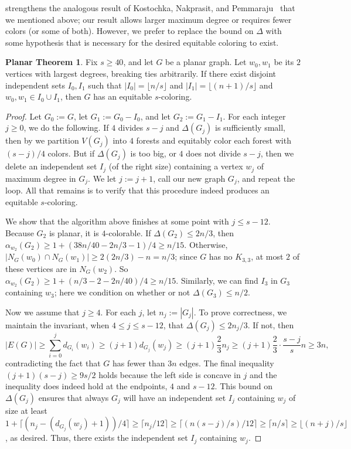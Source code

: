 \documentclass[11pt]{article}
\theoremstyle{definition}
\newtheorem*{planarthm}{Planar Theorem}
\newcommand\floor[1]{\lfloor#1\rfloor}
\newcommand\ceil[1]{\lceil#1\rceil}
\renewcommand\ge\geqslant
\renewcommand\le\leqslant
\begin{document}
 strengthens the analogous result of Kostochka, Nakprasit, and Pemmaraju~\cite{KNP} that we mentioned above; our result 
allows larger maximum degree or requires fewer colors (or some of both).  
However, we prefer to replace the bound on $\Delta$ with some hypothesis that is necessary for the desired equitable coloring to exist.  
\begin{planarthm}
	Fix $s\ge 40$, and let $G$ be a planar graph.  Let $w_0,w_1$ be its $2$ vertices with largest degrees, breaking ties arbitrarily.
	If there exist disjoint independent sets $I_0, I_1$ such that $|I_0|=\floor{n/s}$ and $|I_1| = \floor{(n+1)/s}$ and $w_0,w_1\in I_0\cup I_1$, 
	then $G$ has an equitable $s$-coloring.  
\end{planarthm}
\begin{proof}
	Let $G_0:=G$, let $G_1:=G_0-I_0$, and let $G_2:=G_1-I_1$.
	For each integer $j\ge 0$, we do the following.  If $4$ divides $s-j$ and $\Delta(G_j)$ is sufficiently small, then by  we 
	partition $V(G_j)$ into $4$ forests and equitably color each forest with $(s-j)/4$ colors.  But if $\Delta(G_j)$ is too big, or $4$ does not 
	divide $s-j$, then we delete an independent set $I_j$ (of the right size) containing a vertex $w_j$ of maximum degree in $G_j$. We let $j:=j+1$, 
	call our new graph $G_j$, and repeat the loop.  All that remains is to verify that this procedure indeed produces an equitable $s$-coloring.

	We show that the algorithm above finishes at some point with $j\le s-12$.
	Because $G_2$ is planar, it is $4$-colorable.  If $\Delta(G_2)\le 2n/3$, then $\alpha_{w_2}(G_2)\ge 1 + (38n/40 - 2n/3-1)/4\ge n/15$.
	Otherwise, $|N_G(w_0)\cap N_G(w_1)|\ge 2(2n/3) - n = n/3$; since $G$ has no $K_{3,3}$, at most $2$ of these vertices are in $N_G(w_2)$.
	So $\alpha_{w_2}(G_2) \ge 1 + (n/3-2-2n/40)/4 \ge n/15$.  Similarly, we can find $I_3$ in $G_3$ containing $w_3$; here we condition on 
	whether or not $\Delta(G_3)\le n/2$.  

	Now we assume that $j\ge 4$.
	For each $j$, let $n_j:=|G_j|$.  To prove correctness, we maintain the invariant, when $4\le j\le s-12$, that $\Delta(G_j) \le 2n_j/3$.
	If not, then 
	$$|E(G)| \ge \sum_{i=0}^jd_{G_i}(w_i) \ge (j+1)d_{G_j}(w_j) \ge (j+1)\frac23n_j\ge (j+1)\frac23\cdot\frac{s-j}sn \ge 3n,$$
	contradicting the fact that $G$ has fewer than $3n$ edges.  The final inequality $(j+1)(s-j)\ge 9s/2$ holds because the left side 
	is concave in $j$ and the inequality does indeed hold at the endpoints, $4$ and $s-12$.  This bound on $\Delta(G_j)$ ensures that always 
	$G_j$ will have
	an independent set $I_j$ containing $w_j$ of size at least $1+\ceil{(n_j - (d_{G_j}(w_j)+1))/4}\ge \ceil{n_j/12}\ge \ceil{(n(s-j)/s)/12}
	\ge\ceil{n/s}\ge \floor{(n+j)/s}$, as desired.  Thus, there exists the independent set $I_j$ containing $w_j$.


\end{proof}
\end{document}
